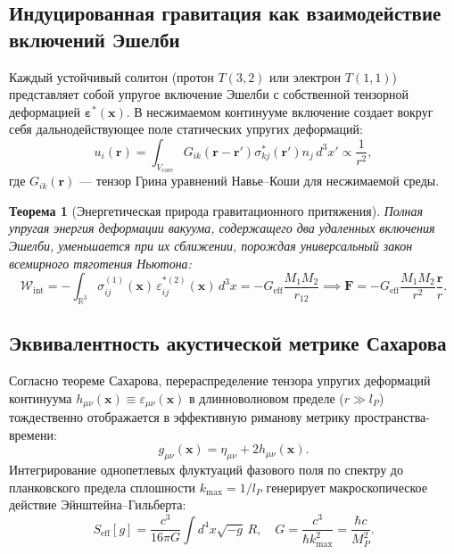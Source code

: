 \documentclass[12pt,a4paper]{article}
\newtheorem{theorem}{Теорема}
\begin{document}
	\subsection{Индуцированная гравитация как взаимодействие включений Эшелби}
	Каждый устойчивый солитон (протон $T(3,2)$ или электрон $T(1,1)$) представляет собой упругое включение Эшелби с собственной тензорной деформацией $\boldsymbol{\varepsilon}^*(\mathbf{x})$. В несжимаемом континууме включение создает вокруг себя дальнодействующее поле статических упругих деформаций:
	\begin{equation}
		u_i(\mathbf{r}) = \int_{V_{\text{core}}} G_{ik}(\mathbf{r} - \mathbf{r}') \sigma_{kj}^*(\mathbf{r}') n_j \, d^3x' \propto \frac{1}{r^2},
	\end{equation}
	где $G_{ik}(\mathbf{r})$ --- тензор Грина уравнений Навье--Коши для несжимаемой среды.
	
	\begin{theorem}[Энергетическая природа гравитационного притяжения]
		Полная упругая энергия деформации вакуума, содержащего два удаленных включения Эшелби, уменьшается при их сближении, порождая универсальный закон всемирного тяготения Ньютона:
		\begin{equation}
			\mathcal{W}_{\text{int}} = -\int_{\mathbb{R}^3} \sigma_{ij}^{(1)}(\mathbf{x}) \, \varepsilon_{ij}^{*(2)}(\mathbf{x}) \, d^3x = - G_{\text{eff}} \frac{M_1 M_2}{r_{12}} \implies \mathbf{F} = - G_{\text{eff}} \frac{M_1 M_2}{r^2} \frac{\mathbf{r}}{r}.
		\end{equation}
	\end{theorem}
	
	\subsection{Эквивалентность акустической метрике Сахарова}
	Согласно теореме Сахарова, перераспределение тензора упругих деформаций континуума $h_{\mu\nu}(\mathbf{x}) \equiv \varepsilon_{\mu\nu}(\mathbf{x})$ в длинноволновом пределе ($r \gg l_P$) тождественно отображается в эффективную риманову метрику пространства-времени:
	\begin{equation}
		g_{\mu\nu}(\mathbf{x}) = \eta_{\mu\nu} + 2 h_{\mu\nu}(\mathbf{x}).
	\end{equation}
	Интегрирование однопетлевых флуктуаций фазового поля по спектру до планковского предела сплошности $k_{\text{max}} = 1/l_P$ генерирует макроскопическое действие Эйнштейна--Гильберта:
	\begin{equation}
		S_{\text{eff}}[g] = \frac{c^3}{16\pi G} \int d^4x \sqrt{-g} \, R, \quad G = \frac{c^3}{\hbar k_{\text{max}}^2} = \frac{\hbar c}{M_P^2}.
	\end{equation}
	
\end{document}
